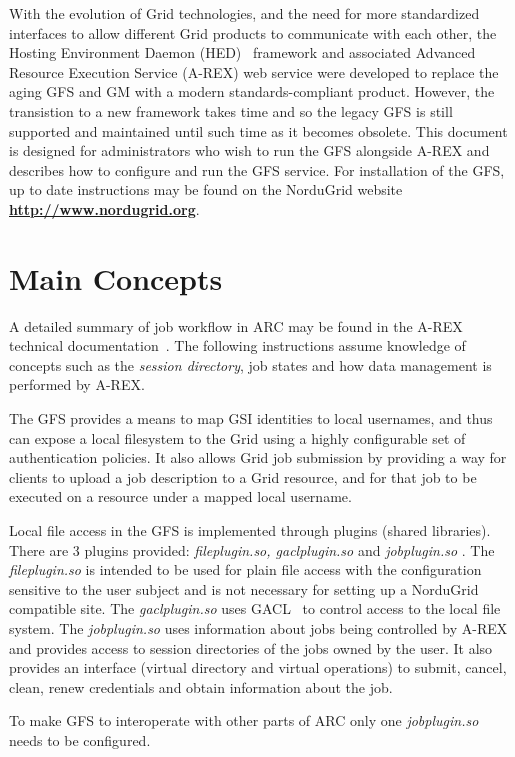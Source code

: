 \documentclass{article}
\begin{document}
With the evolution of Grid technologies, and the need for more
standardized interfaces to allow different Grid products to
communicate with each other, the Hosting Environment Daemon
(HED)~\cite{HED} framework and associated Advanced Resource Execution
Service (A-REX) web service were developed to replace the aging GFS
and GM with a modern standards-compliant product. However, the
transistion to a new framework takes time and so the legacy GFS is
still supported and maintained until such time as it becomes
obsolete. This document is designed for administrators who wish to run
the GFS alongside A-REX and describes how to configure and run the GFS
service. For installation of the GFS, up to date instructions may be
found on the NorduGrid website \textbf{\url{http://www.nordugrid.org}}.

\section{Main Concepts}

A detailed summary of job workflow in ARC may be found in the A-REX
technical documentation~\cite{arex}. The following instructions
assume knowledge of concepts such as the \emph{session directory},
job states and how data management is performed by A-REX.

The GFS provides a means to map GSI identities to local usernames, and
thus can expose a local filesystem to the Grid using a highly
configurable set of authentication policies. It also allows Grid job
submission by providing a way for clients to upload a job description
to a Grid resource, and for that job to be executed on a resource
under a mapped local username.

Local file access in the GFS is implemented through plugins (shared
libraries). There are 3 plugins provided: \textit{fileplugin.so,
  gaclplugin.so} and \textit{jobplugin.so} . The
\textit{fileplugin.so} is intended to be used for plain file access
with the configuration sensitive to the user subject and is not
necessary for setting up a NorduGrid compatible site. The
\textit{gaclplugin.so} uses GACL~\cite{gacl} to control access to the
local file system. The \textit{jobplugin.so} uses information about
jobs being controlled by A-REX and provides access to session
directories of the jobs owned by the user. It also provides an
interface (virtual directory and virtual operations) to submit,
cancel, clean, renew credentials and obtain information about the job.

To make GFS to interoperate with other parts of ARC only one
\emph{jobplugin.so} needs to be configured.
\end{document}
